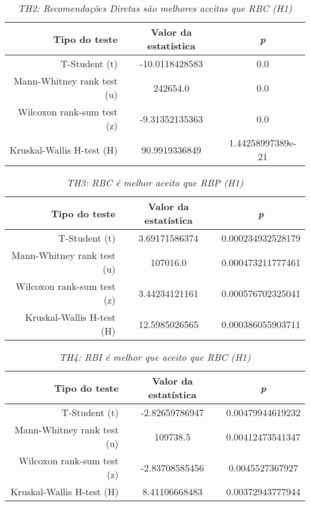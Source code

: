 \begin{table}
\centering
\begin{tabular}{|r|c|c|}
    \hline
    \textbf{Tipo do teste} & \textbf{Valor da estatística} & \textbf{\textit{p}} \\
    \hline
T-Student (t) & -10.0118428583 & 0.0 \\
\hline 
Mann-Whitney rank test (u) & 242654.0 & 0.0 \\
\hline 
Wilcoxon rank-sum test (z) & -9.31352135363 & 0.0 \\
\hline 
Kruskal-Wallis H-test (H) & 90.9919336849 & 1.44258997389e-21 \\
\hline 

    \end{tabular}
\caption{\it TH2: Recomendações Diretas são melhores aceitas que RBC (H1)}
\end{table}


\begin{table}
\centering
\begin{tabular}{|r|c|c|}
    \hline
    \textbf{Tipo do teste} & \textbf{Valor da estatística} & \textbf{\textit{p}} \\
    \hline
T-Student (t) & 3.69171586374 & 0.000234932528179 \\
\hline 
Mann-Whitney rank test (u) & 107016.0 & 0.000473211777461 \\
\hline 
Wilcoxon rank-sum test (z) & 3.44234121161 & 0.000576702325041 \\
\hline 
Kruskal-Wallis H-test (H) & 12.5985026565 & 0.000386055903711 \\
\hline 

    \end{tabular}
\caption{\it TH3: RBC é melhor aceito que RBP (H1)}
\end{table}


\begin{table}
\centering
\begin{tabular}{|r|c|c|}
    \hline
    \textbf{Tipo do teste} & \textbf{Valor da estatística} & \textbf{\textit{p}} \\
    \hline
T-Student (t) & -2.82659786947 & 0.00479944619232 \\
\hline 
Mann-Whitney rank test (u) & 109738.5 & 0.00412473541347 \\
\hline 
Wilcoxon rank-sum test (z) & -2.83708585456 & 0.0045527367927 \\
\hline 
Kruskal-Wallis H-test (H) & 8.41106668483 & 0.00372943777944 \\
\hline 

    \end{tabular}
\caption{\it TH4: RBI é melhor que aceito que RBC (H1)}
\end{table}

